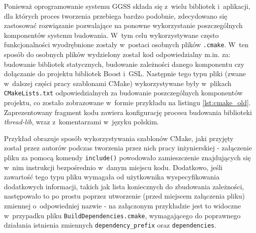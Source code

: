 Ponieważ oprogramowanie systemu GGSS składa się z~wielu bibliotek i~aplikacji, dla których proces tworzenia przebiega bardzo podobnie, zdecydowano się zastosować rozwiązanie pozwalające na ponowne wykorzystanie poszczególnych komponentów systemu budowania. W~tym celu wykorzystywane często funkcjonalności wyodrębnione zostały w~postaci osobnych plików \lstinline{.cmake}. W~ten sposób do osobnych plików wydzielony został kod odpowiedzialny m.in. za: budowanie bibliotek statycznych, budowanie zależności danego komponentu czy dołączanie do projektu bibliotek Boost i~GSL. Następnie tego typu pliki (zwane w~dalszej części pracy szablonami CMake) wykorzystywane były w~plikach \lstinline{CMakeLists.txt} odpowiedzialnych za budowanie poszczególnych komponentów projektu, co zostało zobrazowane w~formie przykładu na listingu \ref{lst:cmake_old}. Zaprezentowany fragment kodu zawiera konfigurację procesu budowania biblioteki \emph{thread-lib}, wraz z~komentarzami w~języku polskim. 



Przykład obrazuje sposób wykorzystywania szablonów CMake, jaki przyjęty został przez autorów podczas tworzenia przez nich pracy inżynierskiej - załączenie pliku za pomocą komendy \lstinline{include()} powodowało zamieszczenie znajdujących się w~nim instrukcji bezpośrednio w~danym miejscu kodu. Dodatkowo, jeśli zawartość tego typu pliku wymagała od użytkownika wyspecyfikowania dodatkowych informacji, takich jak lista koniecznych do zbudowania zależności, następowało to po prostu poprzez utworzenie (przed miejscem załączenia pliku) zmiennej o~odpowiedniej nazwie - na załączonym przykładzie jest to widoczne w~przypadku pliku \lstinline{BuildDependencies.cmake}, wymagającego do poprawnego działania istnienia zmiennych \lstinline{dependency_prefix} oraz \lstinline{dependencies}.

